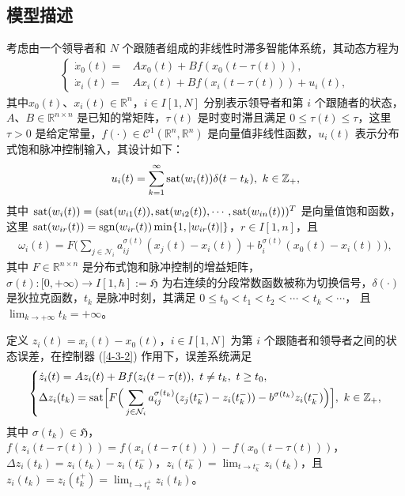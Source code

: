 \subsection{模型描述}
考虑由一个领导者和 $N$ 个跟随者组成的非线性时滞多智能体系统，其动态方程为 
\begin{align}\label{4-3-1}
\left\{\begin{aligned} 
\dot{x}_0(t)=&Ax_0(t)+Bf(x_0(t-\tau(t))),\\
\dot{x}_i(t)=&Ax_i(t)+Bf(x_i(t-\tau(t)))+u_i(t),
\end{aligned}\right.
\end{align}
其中$x_0(t)$、$x_i(t)\in \mathbb{R}^n$，$i\in I[1,N]$ 分别表示领导者和第 $i$ 个跟随者的状态，$A$、$ B\in\mathbb{R}^{n\times n}$ 是已知的常矩阵，$\tau(t)$ 是时变时滞且满足 $0\leq\tau(t)\leq \tau$，这里 $\tau>0$ 是给定常量，$f(\cdot)\in \mathcal{C}^1( \mathbb{R}^n,\mathbb{R}^n) $ 是向量值非线性函数，$u_i(t)$ 表示分布式饱和脉冲控制输入，其设计如下：
\begin{align}\label{4-3-2}
u_i(t)=\sum\limits_{k=1}^{\infty}{\rm sat}(w_i(t)) \delta (t-t_k),\ k\in\mathbb{Z}_+,
\end{align}
其中 ${\rm sat}(w_i(t))=({\rm sat}( w_{i1}(t)), {\rm sat}( w_{i2}(t)),\cdots,{\rm sat}( w_{in}(t)))^T$ 是向量值饱和函数，这里 ${\rm sat}( w_{ir}(t))={\rm sgn}  (w_{ir}(t))\min\{1,|w_{ir}(t)|\}$，$r \in I[1,n]$，且 
\begin{align*}
\omega_i(t)=F\Big(\sum\limits_{j\in \mathcal{N}_i}a^{\sigma(t)}_{ij}(x_j(t)-x_i(t))+b^{\sigma(t)}_i(x_0(t)-x_i(t))\Big),
\end{align*}
其中 $F\in\mathbb{R}^{n\times n}$ 是分布式饱和脉冲控制的增益矩阵，$\sigma(t): [0,+\infty)\rightarrow
I[1,\hbar]:=\mathfrak{H}$ 为右连续的分段常数函数被称为切换信号，$\delta(\cdot)$ 是狄拉克函数，$t_k$ 是脉冲时刻，其满足 
$ 0\leq t_0<t_1<t_2<\cdots<t_k<\cdots$， 且 $\lim_{k \rightarrow+\infty}t_k=+\infty$。

定义 $z_i(t)=x_i(t)-x_0(t)$，$i\in I[1,N]$ 为第 $i$ 个跟随者和领导者之间的状态误差，在控制器  (\ref{4-3-2}) 作用下，误差系统满足 
\begin{align}\label{4-3-3}
\left\{
\begin{aligned}  
&\dot{z}_i(t)=Az_i(t)+Bf(z_i(t-\tau(t)),\ t\neq t_k,\  t\geq t_0,\\
&\Delta z_i(t_k)={\rm sat}\Big[F\Big(\sum\limits_{j\in \mathcal{N}_i} a^{\sigma(t_k)}_{ij}(z_j(t^-_k)-z_i(t^-_k)) -b^{\sigma(t_k)}z_i(t^-_k)\Big)\Big],\ k\in \mathbb{Z}_+,
\end{aligned}
\right.
\end{align}
其中 $\sigma(t_k)\in \mathfrak{H}$，$f(z_i(t-\tau(t)))=f(x_i(t-\tau(t)))-f(x_0(t-\tau(t)))$，$\Delta z_i(t_k)=z_i(t_k)-z_i(t^-_k)$，$ z_i(t^-_k)=\lim_{t\rightarrow t^-_k}z_i(t_k)$，且  $z_i(t_k)=z_i(t^+_k)=\lim_{t\rightarrow t^+_k}z_i(t_k)$。

